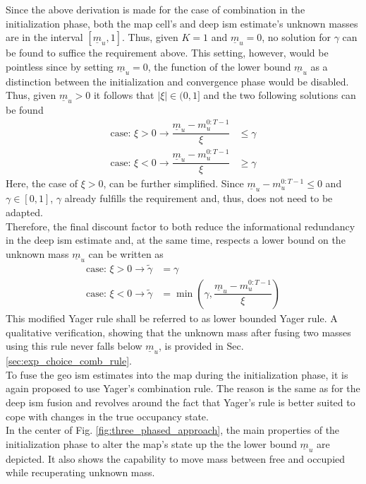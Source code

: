 Since the above derivation is made for the case of combination in the initialization phase, both the map cell's and deep \gls{ism} estimate's unknown masses are in the interval $[\underline{m}_u,1]$. Thus, given $K=1$ and $\underline{m}_u = 0$, no solution for $\gamma$ can be found to suffice the requirement above. This setting, however, would be pointless since by setting $\underline{m}_u = 0$, the function of the lower bound $\underline{m}_u$ as a distinction between the initialization and convergence phase would be disabled.
Thus, given $\underline{m}_u > 0$ it follows that $|\xi| \in (0,1]$ and the two following solutions can be found 
\begin{align}
	\text{case: } \xi > 0 \rightarrow \dfrac{\underline{m}_u -m_{u}^{0:T-1}}{\xi} &\leq \gamma\\
	\text{case: } \xi < 0 \rightarrow \dfrac{\underline{m}_u -m_{u}^{0:T-1}}{\xi} &\geq \gamma 
\end{align}
Here, the case of $\xi > 0$, can be further simplified. Since $\underline{m}_u -m_{u}^{0:T-1} \leq 0$ and $\gamma \in [0,1]$, $\gamma$ already fulfills the requirement and, thus, does not need to be adapted.\\
Therefore, the final discount factor to both reduce the informational redundancy in the deep \gls{ism} estimate and, at the same time, respects a lower bound on the unknown mass $\underline{m}_{u}$ can be written as 
\begin{align}
	\text{case: } \xi > 0 \rightarrow \tilde{\gamma} &= \gamma\\
%
	\text{case: } \xi < 0 \rightarrow \tilde{\gamma} &= \min \left(\gamma, \dfrac{\underline{m}_u -m_{u}^{0:T-1}}{\xi} \right)
\end{align}
This modified Yager rule shall be referred to as lower bounded Yager rule. A qualitative verification, showing that the unknown mass after fusing two masses using this rule never falls below $\underline{m}_u$, is provided in Sec. \ref{sec:exp_choice_comb_rule}.
\\
To fuse the geo \gls{ism} estimates into the map during the initialization phase, it is again proposed to use Yager's combination rule. The reason is the same as for the deep \gls{ism} fusion and revolves around the fact that Yager's rule is better suited to cope with changes in the true occupancy state.
\\
In the center of Fig. \ref{fig:three_phased_approach}, the main properties of the initialization phase to alter the map's state up the the lower bound $\underline{m}_{u}$ are depicted. It also shows the capability to move mass between free and occupied while recuperating unknown mass.
